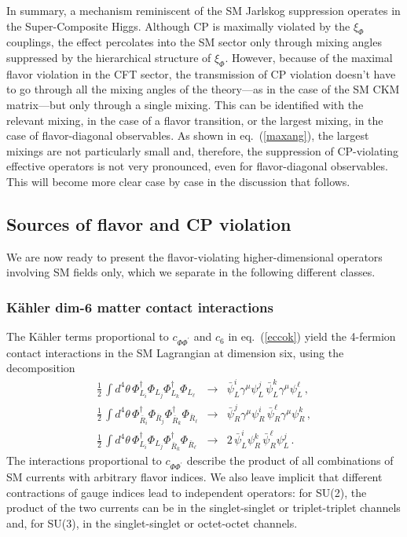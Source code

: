 \documentclass[a4paper,12pt]{article}
\newcommand{\bea}{\begin{eqnarray}}
\newcommand{\eea}{\end{eqnarray}}
\def\eq#1{eq.~(\ref{#1})}
\def\eq#1{eq.~(\ref{#1})}
\begin{document}
In summary, a mechanism reminiscent of the SM Jarlskog suppression operates in the Super-Composite Higgs. Although CP is maximally violated by the $\xi_\Phi$ couplings, the effect percolates into the SM sector only through mixing angles suppressed by the hierarchical structure of $\xi_\Phi$. However, because of the maximal flavor violation in the CFT sector, the transmission of CP violation doesn't have to go through all the mixing angles of the theory---as in the case of the SM CKM matrix---but only through a single mixing. This can be identified with the relevant mixing, in the case of a flavor transition, or the largest mixing, in the case of flavor-diagonal observables.  As shown in \eq{maxang}, the largest mixings are not particularly small and, therefore, the suppression of CP-violating effective operators is not very pronounced, even for flavor-diagonal observables.  This will become more clear case by case in the discussion that follows.

\subsection{Sources of flavor and CP violation}
\label{sec:sourcesFCP}

We are now ready to present the flavor-violating higher-dimensional operators involving SM fields only, which we separate in the following different classes.

\boldmath
\subsubsection*{K\"ahler dim-6 matter contact interactions}
\unboldmath

The K\"ahler terms proportional to $c_{\Phi \Phi^\prime}$ and $c_6$ in \eq{eccok} yield the 4-fermion contact interactions in the SM Lagrangian at dimension six, using the decomposition
\bea
\frac{1}{2}\, \int d^4\theta \,\Phi_{L_i}^\dagger \Phi_{L_j}\Phi_{L_k}^\dagger \Phi_{L_\ell} &\longrightarrow &  {\bar \psi}_L^i \gamma^\mu \psi_L^j \, {\bar \psi}_L^k \gamma^\mu \psi_L^\ell  \, ,\\
\frac{1}{2}\, \int d^4\theta \,\Phi_{{\bar R}_i}^\dagger \Phi_{{\bar R}_j}\Phi_{{\bar R}_k}^\dagger \Phi_{{\bar R}_\ell} &\longrightarrow &  {\bar \psi}_R^j \gamma^\mu \psi_R^i \, {\bar \psi}_R^\ell \gamma^\mu \psi_R^k  \, ,\\
\frac{1}{2}\, \int d^4\theta \,\Phi_{L_i}^\dagger \Phi_{L_j}\Phi_{{\bar R}_k}^\dagger \Phi_{{\bar R}_\ell}  &\longrightarrow & 2\, {\bar \psi}_L^i  \psi_R^k \, {\bar \psi}_R^\ell  \psi_L^j  \, .
\eea
The interactions proportional to $c_{\Phi \Phi^\prime}$ describe the product of all combinations of SM currents with arbitrary flavor indices. We also leave implicit that  different contractions of gauge indices lead to independent operators: for SU(2), the product of the two currents can be in the singlet-singlet or triplet-triplet channels and, for SU(3), in the singlet-singlet or octet-octet channels.
\end{document}
